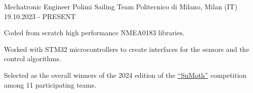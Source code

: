 
\cventry
{Mechatronic Engineer}
{Polimi Sailing Team}
{Politecnico di Milano, Milan (IT)}
{19.10.2023 - PRESENT}
{
    \begin{cvitems}
        \item {Coded from scratch high performance NMEA0183 libraries.}
        \item {Worked with STM32 microcontrollers to create interfaces for the sensors and the control algorithms.}
        \item {Selected as the overall winners of the 2024 edition of the \href{https://sumoth.org/}{``SuMoth''} competition among 11 participating teams.}
    \end{cvitems}
}